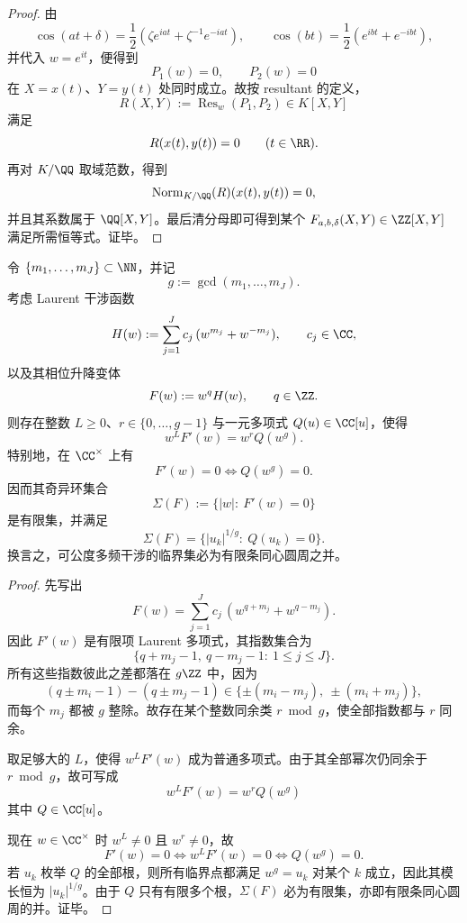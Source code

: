 \begin{proof}
由
\[
\cos(at+\delta)
=
\frac12(\zeta e^{iat}+\zeta^{-1}e^{-iat}),
\qquad
\cos(bt)
=
\frac12(e^{ibt}+e^{-ibt}),
\]
并代入 \(w=e^{it}\)，便得到
\[
P_1(w)=0,
\qquad
P_2(w)=0
\]
在 \(X=x(t)\)、\(Y=y(t)\) 处同时成立。故按 resultant 的定义，
\[
R(X,Y):=\operatorname{Res}_{w}(P_1,P_2)\in K[X,Y]
\]
满足
\[
R(x(t),y(t))=0
\qquad
(t\in\RR).
\]
再对 \(K/\QQ\) 取域范数，得到
\[
\operatorname{Norm}_{K/\QQ}(R)(x(t),y(t))=0,
\]
并且其系数属于 \(\QQ[X,Y]\)。最后清分母即可得到某个
\(
F_{a,b,\delta}(X,Y)\in\ZZ[X,Y]
\)
满足所需恒等式。证毕。
\end{proof}
\begin{theorem}\label{thm:derived-commensurable-multifrequency-singular-rings}
令 \(\{m_1,\dots,m_J\}\subset\NN\)，并记
\[
g:=\gcd(m_1,\dots,m_J).
\]
考虑 Laurent 干涉函数
\[
H(w):=\sum_{j=1}^{J}c_j\,(w^{m_j}+w^{-m_j}),
\qquad
c_j\in\CC,
\]
以及其相位升降变体
\[
F(w):=w^qH(w),
\qquad
q\in\ZZ.
\]
则存在整数 \(L\ge 0\)、\(r\in\{0,\dots,g-1\}\) 与一元多项式 \(Q(u)\in\CC[u]\)，使得
\[
w^LF'(w)=w^rQ(w^g).
\]
特别地，在 \(\CC^\times\) 上有
\[
F'(w)=0
\iff
Q(w^g)=0.
\]
因而其奇异环集合
\[
\Sigma(F):=\{|w|:\ F'(w)=0\}
\]
是有限集，并满足
\[
\Sigma(F)=\{|u_k|^{1/g}:\ Q(u_k)=0\}.
\]
换言之，可公度多频干涉的临界集必为有限条同心圆周之并。
\end{theorem}

\begin{proof}
先写出
\[
F(w)=\sum_{j=1}^{J}c_j\,(w^{q+m_j}+w^{q-m_j}).
\]
因此 \(F'(w)\) 是有限项 Laurent 多项式，其指数集合为
\[
\{q+m_j-1,\ q-m_j-1:\ 1\le j\le J\}.
\]
所有这些指数彼此之差都落在 \(g\ZZ\) 中，因为
\[
(q\pm m_i-1)-(q\pm m_j-1)\in\{\pm(m_i-m_j),\ \pm(m_i+m_j)\},
\]
而每个 \(m_j\) 都被 \(g\) 整除。故存在某个整数同余类 \(r\bmod g\)，使全部指数都与 \(r\) 同余。

取足够大的 \(L\)，使得 \(w^LF'(w)\) 成为普通多项式。由于其全部幂次仍同余于 \(r\bmod g\)，故可写成
\[
w^LF'(w)=w^rQ(w^g)
\]
其中 \(Q\in\CC[u]\)。

现在 \(w\in\CC^\times\) 时 \(w^L\neq 0\) 且 \(w^r\neq 0\)，故
\[
F'(w)=0
\iff
w^LF'(w)=0
\iff
Q(w^g)=0.
\]
若 \(u_k\) 枚举 \(Q\) 的全部根，则所有临界点都满足 \(w^g=u_k\) 对某个 \(k\) 成立，因此其模长恒为 \(|u_k|^{1/g}\)。由于 \(Q\) 只有有限多个根，\(\Sigma(F)\) 必为有限集，亦即有限条同心圆周的并。证毕。
\end{proof}
